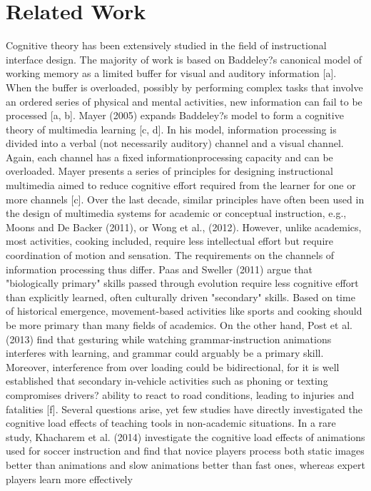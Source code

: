 \documentclass{sigchi}
\begin{document}
\section{Related Work}
Cognitive theory has been extensively studied in the field of instructional interface
design. The majority of work is based on Baddeley?s canonical model of working
memory as a limited buffer for visual and auditory information [a]. When the buffer is
overloaded, possibly by performing complex tasks that involve an ordered series of
physical and mental activities, new information can fail to be processed [a, b]. Mayer
(2005) expands Baddeley?s model to form a cognitive theory of multimedia learning [c,
d]. In his model, information processing is divided into a verbal (not necessarily
auditory) channel and a visual channel. Again, each channel has a fixed informationprocessing
capacity and can be overloaded. Mayer presents a series of principles for
designing instructional multimedia aimed to reduce cognitive effort required from the
learner for one or more channels [c].
Over the last decade, similar principles have often been used in the design of
multimedia systems for academic or conceptual instruction, e.g., Moons and De Backer
(2011), or Wong et al., (2012). However, unlike academics, most activities, cooking
included, require less intellectual effort but require coordination of motion and
sensation. The requirements on the channels of information processing thus differ.
Paas and Sweller (2011) argue that "biologically primary" skills passed through evolution
require less cognitive effort than explicitly learned, often culturally driven "secondary"
skills. Based on time of historical emergence, movement-based activities like sports and
cooking should be more primary than many fields of academics. On the other hand,
Post et al. (2013) find that gesturing while watching grammar-instruction animations
interferes with learning, and grammar could arguably be a primary skill. Moreover,
interference from over loading could be bidirectional, for it is well established that
secondary in-vehicle activities such as phoning or texting compromises drivers? ability to
react to road conditions, leading to injuries and fatalities [f].
Several questions arise, yet few studies have directly investigated the cognitive load
effects of teaching tools in non-academic situations. In a rare study, Khacharem et al.
(2014) investigate the cognitive load effects of animations used for soccer instruction
and find that novice players process both static images better than animations and
slow animations better than fast ones, whereas expert players learn more effectively
\end{document}
